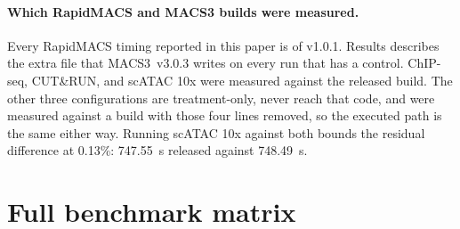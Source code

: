 \documentclass[10pt]{article}
\begin{document}
\paragraph{Which RapidMACS and MACS3 builds were measured.}
Every RapidMACS timing reported in this paper is of v1.0.1. Results describes the extra file that MACS3~v3.0.3 writes on every run that has a control. ChIP-seq, CUT\&RUN, and scATAC 10x were measured against the released build. The other three configurations are treatment-only, never reach that code, and were measured against a build with those four lines removed, so the executed path is the same either way. Running scATAC 10x against both bounds the residual difference at 0.13\%: 747.55~s released against 748.49~s.

\section{Full benchmark matrix}
\end{document}

